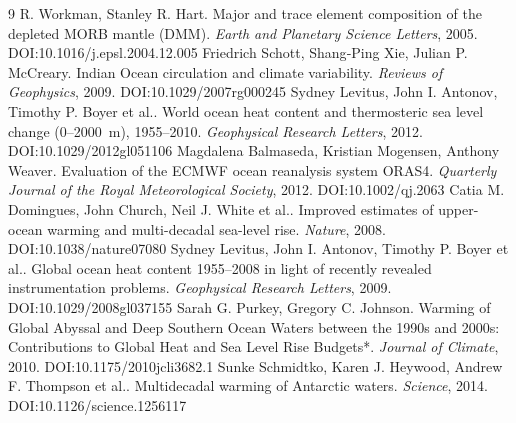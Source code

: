 \documentclass[11pt]{article}
\begin{document}
\begin{thebibliography}{9}
 R. Workman, Stanley R. Hart. Major and trace element composition of the depleted MORB mantle (DMM). \emph{Earth and Planetary Science Letters}, 2005. DOI:10.1016/j.epsl.2004.12.005
 Friedrich Schott, Shang‐Ping Xie, Julian P. McCreary. Indian Ocean circulation and climate variability. \emph{Reviews of Geophysics}, 2009. DOI:10.1029/2007rg000245
 Sydney Levitus, John I. Antonov, Timothy P. Boyer et al.. World ocean heat content and thermosteric sea level change (0–2000 m), 1955–2010. \emph{Geophysical Research Letters}, 2012. DOI:10.1029/2012gl051106
 Magdalena Balmaseda, Kristian Mogensen, Anthony Weaver. Evaluation of the ECMWF ocean reanalysis system ORAS4. \emph{Quarterly Journal of the Royal Meteorological Society}, 2012. DOI:10.1002/qj.2063
 Catia M. Domingues, John Church, Neil J. White et al.. Improved estimates of upper-ocean warming and multi-decadal sea-level rise. \emph{Nature}, 2008. DOI:10.1038/nature07080
 Sydney Levitus, John I. Antonov, Timothy P. Boyer et al.. Global ocean heat content 1955–2008 in light of recently revealed instrumentation problems. \emph{Geophysical Research Letters}, 2009. DOI:10.1029/2008gl037155
 Sarah G. Purkey, Gregory C. Johnson. Warming of Global Abyssal and Deep Southern Ocean Waters between the 1990s and 2000s: Contributions to Global Heat and Sea Level Rise Budgets*. \emph{Journal of Climate}, 2010. DOI:10.1175/2010jcli3682.1
 Sunke Schmidtko, Karen J. Heywood, Andrew F. Thompson et al.. Multidecadal warming of Antarctic waters. \emph{Science}, 2014. DOI:10.1126/science.1256117
\end{thebibliography}
\end{document}
